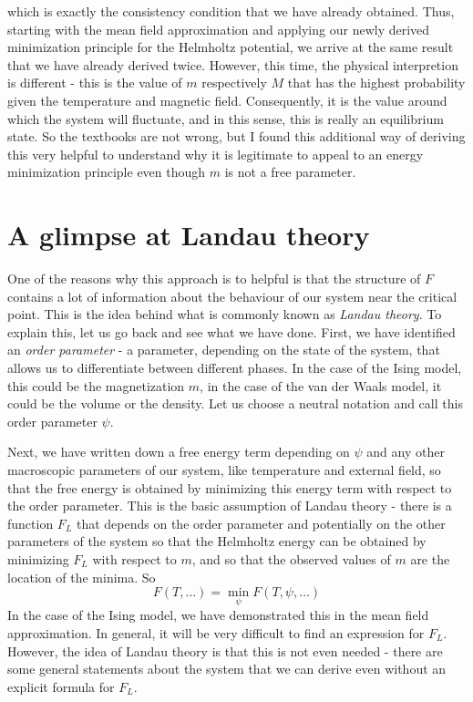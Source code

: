 \documentclass[a4paper, draft]{article}
\theoremstyle{own}
\theoremstyle{remark}
\begin{document}
which is exactly the consistency condition that we have already obtained. Thus, starting with the mean field approximation and applying our newly derived minimization principle for the Helmholtz potential, we arrive at the same result that we have already derived twice. However, this time, the physical interpretion is different - this is the value of $m$ respectively $M$ that has the highest probability given the temperature and magnetic field. Consequently, it is the value around which the system will fluctuate, and in this sense, this is really an equilibrium state. So the textbooks are not wrong, but I found this additional way of deriving this very helpful to understand why it is legitimate to appeal to an energy minimization principle even though $m$ is not a free parameter.

\section{A glimpse at Landau theory}

One of the reasons why this approach is to helpful is that the structure of $F$ contains a lot of information about the behaviour of our system near the critical point. This is the idea behind what is commonly known as {\em Landau theory}. To explain this, let us go back and see what we have done. First, we have identified an {\em order parameter} - a parameter, depending on the state of the system, that allows us to differentiate between different phases. In the case of the Ising model, this could be the magnetization $m$, in the case of the van der Waals model, it could be the volume or the density. Let us choose a neutral notation and call this order parameter $\psi$. 

Next, we have written down a free energy term depending on $\psi$ and any other macroscopic parameters of our system, like temperature and external field, so that the free energy is obtained by minimizing this energy term with respect to the order parameter. This is the basic assumption of Landau theory - there is a function $F_L$ that depends on the order parameter and potentially on the other parameters of the system so that the Helmholtz energy can be obtained by minimizing $F_L$ with respect to $m$, and so that the observed values of $m$ are the location of the minima. So 
$$
F(T, \dots) = \min_{\psi} F(T, \psi, \dots)
$$
In the case of the Ising model, we have demonstrated this in the mean field approximation. In general, it will be very difficult to find an expression for $F_L$. However, the idea of Landau theory is that this is not even needed - there are some general statements about the system that we can derive even without an explicit formula for $F_L$. 
\end{document}
